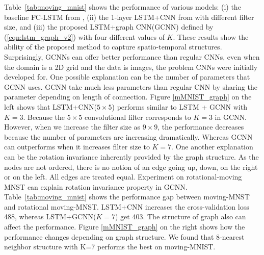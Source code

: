 \documentclass{article} %
\newcommand{\tabref}[1]{Table~\ref{tab:#1}}
\newcommand{\eqnref}[1]{(\ref{eqn:#1})}
\begin{document}

\tabref{moving_mnist} shows the performance of various models: (i) the baseline
FC-LSTM from \citet{convlstm}, (ii) the 1-layer LSTM+CNN from \citet{convlstm}
with different filter size, and (iii) the proposed LSTM+graph CNN(GCNN) defined by \eqnref{lstm_graph_v2} with four
different values of $K$. These results show the ability of the proposed method
to capture spatio-temporal structures. Surprisingly, GCNNs can offer
better performance than regular CNNs, even when the domain is a 2D grid and the
data is images, the problem CNNs were initially developed for. One possible explanation can be the number of parameters that GCNN uses. GCNN take much less parameters than regular CNN by sharing the parameter depending on length of connection. Figure \ref{mMNIST_graph} on the left shows that LSTM+CNN($5\times5$) performs similar to LSTM + GCNN with $K = 3$. Because the $5\times5$ convolutional filter corresponds to $K=3$ in GCNN. However, when we increase the filter size as $9\times9$, the performance decreases because the number of parameters are increasing dramatically. Whereas GCNN can outperforms when it increases filter size to $K=7$. One another explanation can be the rotation invariance inherently provided by the graph structure. As
the nodes are not ordered, there is no notion of an edge going up, down, on the
right or on the left. All edges are treated equal. Experiment on rotational-moving MNST can explain rotation invariance property in GCNN. \tabref{moving_mnist} shows the performance gap between moving-MNST and rotational moving-MNST. LSTM+CNN increases the cross-validation loss 488, whereas LSTM+GCNN($K=7$) get 403. The structure of graph also can affect the performance. Figure \ref{mMNIST_graph} on the right shows how the performance changes depending on graph structure. We found that 8-nearest neighbor structure with K=7 performs the best on moving-MNIST. 

\end{document}
